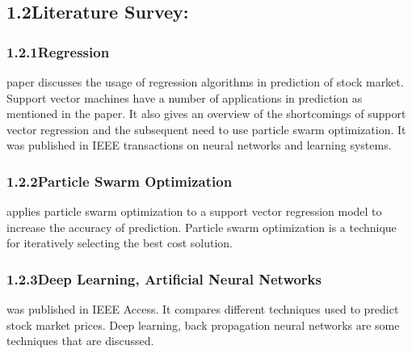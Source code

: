 \documentclass[12pt]{article}
\begin{document}
\vspace{\baselineskip}
\subsection*{1.2\hspace*{10pt}Literature Survey:}
\subsubsection*{1.2.1\hspace*{10pt}Regression}
\begin{justify}
[1] paper discusses the usage of regression algorithms in prediction of stock market. Support vector machines have a number of applications in prediction as mentioned in the paper. It also gives an overview of the shortcomings of support vector regression and the subsequent need to use particle swarm optimization. It was published in IEEE transactions on neural networks and learning systems.
\end{justify}\par


\vspace{\baselineskip}

\vspace{\baselineskip}
\subsubsection*{1.2.2\hspace*{10pt}Particle Swarm Optimization }
\begin{justify}
[1] applies particle swarm optimization to a support vector regression model to increase the accuracy of prediction. Particle swarm optimization is a technique for iteratively selecting the best cost solution.
\end{justify}\par


\vspace{\baselineskip}

\vspace{\baselineskip}
\subsubsection*{1.2.3\hspace*{10pt}Deep Learning, Artificial Neural Networks}
\begin{justify}
[2] was published in IEEE Access. It compares different techniques used to predict stock market prices. Deep learning, back propagation neural networks are some techniques that are discussed.
\end{justify}\par
\end{document}
